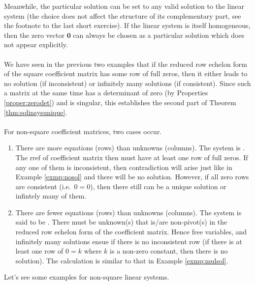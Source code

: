 Meanwhile, the particular solution can be set to any valid solution to the linear system (the choice does not affect the structure of its complementary part, see the footnote to the last short exercise). If the linear system is itself homogeneous, then the zero vector $\textbf{0}$ can always be chosen as a particular solution which does not appear explicitly.\\
\\
We have seen in the previous two examples that if the reduced row echelon form of the square coefficient matrix has some row of full zeros, then it either leads to no solution (if inconsistent) or infinitely many solutions (if consistent). Since such a matrix at the same time has a determinant of zero (by Properties \ref{proper:zerodet}) and is singular, this establishes the second part of Theorem \ref{thm:sqlinsysunique}. \\
\\
For non-square coefficient matrices, two cases occur.
\begin{enumerate}
\item There are more equations (rows) than unknowns (columns). The system is . The rref of coefficient matrix then must have at least one row of full zeros. If any one of them is inconsistent, then contradiction will arise just like in Example \ref{exmp:nosol} and there will be no solution. However, if all zero rows are consistent (i.e.\ $0=0$), then there still can be a unique solution or infintely many of them.
\item There are fewer equations (rows) than unknowns (columns). The system is said to be . There must be unknown(s) that is/are non-pivot(s) in the reduced row echelon form of the coefficient matrix. Hence free variables, and infinitely many solutions ensue if there is no inconsistent row (if there is at least one row of $0 = k$ where $k$ is a non-zero constant, then there is no solution). The calculation is similar to that in Example \ref{exmp:mulsol}.
\end{enumerate}
Let's see some examples for non-square linear systems.\

